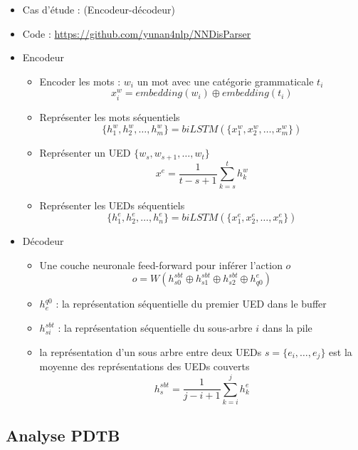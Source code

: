 \documentclass{KodeBook}
\begin{document}
\begin{itemize}
	\item Cas d'étude : \cite{2018-yu-al} (Encodeur-décodeur)
	\item Code : \url{https://github.com/yunan4nlp/NNDisParser}
	\item Encodeur 
	\begin{itemize}
		\item Encoder les mots : $ w_i $ un mot avec une catégorie grammaticale $t_i$
		\[x_i^w = embedding(w_i) \oplus embedding(t_i)\]
		\item Représenter les mots séquentiels
		\[ \{h_1^w, h_2^w, \ldots, h_m^w \} = biLSTM(\{x_1^w, x_2^w, \ldots, x_m^w \})\]
		\item Représenter un UED $\{w_s, w_{s+1}, \ldots, w_t \}$
		\[ x^e = \frac{1}{t-s+1} \sum_{k=s}^{t} h_k^w\]
		\item Représenter les UEDs séquentiels
		\[ \{h_1^e, h_2^e, \ldots, h_n^e \} = biLSTM(\{x_1^e, x_2^e, \ldots, x_n^e \})\]
	\end{itemize}
\end{itemize}

\begin{itemize}
	\item Décodeur 
	\begin{itemize}
		\item Une couche neuronale feed-forward pour inférer l'action $o$
		\[o = W(h_{s0}^{sbt} \oplus h_{s1}^{sbt} \oplus h_{s2}^{sbt} \oplus h_{q0}^{e})\]
		\item $ h_{e}^{q0} $ : la représentation séquentielle du premier UED dans le buffer
		\item $h_{si}^{sbt}$ : la représentation séquentielle du sous-arbre $i$ dans la pile
		\item la représentation d'un sous arbre entre deux UEDs $ s= \{e_i, \ldots, e_j\}$ est la moyenne des représentations des UEDs couverts
		\[ h_{s}^{sbt} = \frac{1}{j-i+1} \sum_{k=i}^{j} h_k^e\]
	\end{itemize}
\end{itemize}

\subsection{Analyse PDTB}
\end{document}
